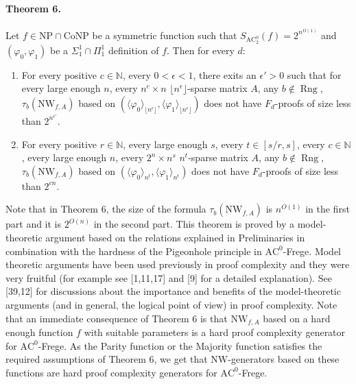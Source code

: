 \documentclass[10pt,a4paper]{article}
\begin{document}
\paragraph{Theorem 6.} Let $f\in\mathrm{NP}\cap\mathrm{CoNP}$ be a symmetric function such that $S_{\mathrm{AC}_2^0}(f)=2^{n^{\Omega(1)}}$ and $(\varphi_0,\varphi_1)$ be a $\Sigma_1^1\cap\Pi_1^1$ definition of $f$. Then for every $d$:
\begin{enumerate}
\item For every positive $c\in\mathbb N$, every $0<\epsilon<1$, there exits an $\epsilon'>0$ such that for every large enough $n$, every $n^c\times n$ $\lfloor n^\epsilon\rfloor$-sparse matrix $A$, any $b\notin\operatorname{Rng}$, $\tau_b(\mathrm{NW}_{f,A})$ based on $(\langle\varphi_0\rangle_{\lfloor n^\epsilon\rfloor},\langle\varphi_1\rangle_{\lfloor n^\epsilon\rfloor})$ does not have $F_d$-proofs of size less than $2^{n^{\epsilon'}}$.
\item For every positive $r\in\mathbb N$, every large enough $s$, every $t\in[s/r,s]$, every $c\in\mathbb N$, every large enough $n$, every $2^n\times n^s$ $n^t$-sparse matrix $A$, any $b\notin\operatorname{Rng}$, $\tau_b(\mathrm{NW}_{f,A})$ based on $(\langle\varphi_0\rangle_{n^t},\langle\varphi_1\rangle_{n^t})$ does not have $F_d$-proofs of size less than $2^{cn}$.
\end{enumerate}

Note that in Theorem 6, the size of the formula $\tau_b(\mathrm{NW}_{f,A})$ is $n^{O(1)}$ in the first part and it is $2^{O(n)}$ in the second part. This theorem is proved by a model-theoretic argument based on the relations explained in Preliminaries in combination with the hardness of the Pigeonhole principle in $\mathrm{AC}^0$-Frege. Model theoretic arguments have been used previously in proof complexity and they were very fruitful (for example see [1,11,17] and [9] for a detailed explanation). See [39,12] for discussions about the importance and benefits of the model-theoretic arguments (and in general, the logical point of view) in proof complexity.
Note that an immediate consequence of Theorem 6 is that $\mathrm{NW}_{f,A}$ based on a hard enough function $f$ with suitable parameters is a hard proof complexity generator for $\mathrm{AC}^0$-Frege. As the Parity function or the Majority function satisfies the required assumptions of Theorem 6, we get that NW-generators based on these functions are hard proof complexity generators for $\mathrm{AC}^0$-Frege.
\end{document}
